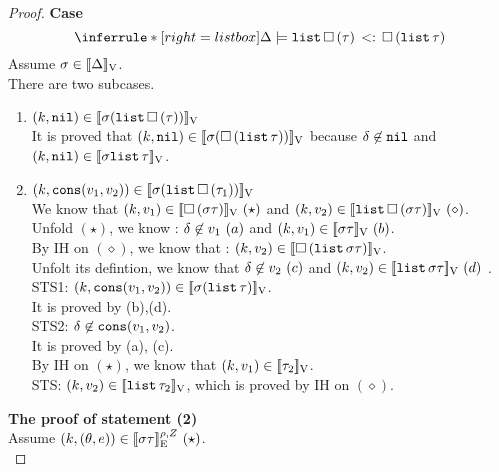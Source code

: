 \begin{proof}
\textbf{Case}
 \[
 \inferrule*[right=listbox]
    {
      \empty
    }
    {
      \Delta \models \sub{ \tlist{\tbox{\tau }}  }{ \tbox{\tlist{\tau}} } 
    }
\]
Assume $ \sigma \in [\![ \Delta ]\!]_{\text{V}}$.\\
There are two subcases. \\
\begin{enumerate}
\item  $ (k, \mathtt{nil} ) \in [\![ \sigma ( \mathtt{list} \, \mathtt{\square} \, (\tau) )   ]\!]_{\text{V}}$ \\
       It is proved that $ (k, \mathtt{nil} ) \in [\![ \sigma ( \mathtt{\square} \, (
         \mathtt{list} \, \tau ) )   ]\!]_{\text{V}}$ because $ \delta \not\in \mathtt{nil}$ and $(k, \mathtt{nil} ) \in [\![ \sigma  \mathtt{list} \, \tau    ]\!]_{\text{V}}  $.\\
\item   $  (k, \mathop{\mathtt{cons}}(v_1,v_2) ) \in [\![ \sigma (
    \mathtt{list} \,   \mathtt{\square} \, (\tau_1)  )  ]\!]_{\text{V}} $ \\
      We know that $ (k, v_1) \in [\![  \mathtt{\square} \, ( \sigma \tau
        )  ]\!]_{\text{V}} 
~(\star) $ and
      $(k, v_2) \in [\![   \mathtt{list} \,   \mathtt{\square} \, (  \sigma \tau)
          ]\!]_{\text{V}}  ~(\diamond)$.\\
      Unfold $(\star)$, we know : $ \delta \not\in v_1~(a)$ and $ (k, v_1) \in [\![  \sigma \tau
          ]\!]_{\text{V}}~(b)  $. \\
      By IH on $(\diamond)$, we know that :  $(k, v_2) \in
      [\![  \mathtt{\square} \, ( \mathtt{list} \,    \sigma \tau   )  ]\!]_{\text{V}}  $.\\
      Unfolt its defintion, we know that $\delta \not\in v_2~(c)$
      and $(k, v_2) \in
      [\![   \mathtt{list} \,    \sigma \tau     ]\!]_{\text{V}}~(d)$ . \\
     STS1: $  (k, \mathop{\mathtt{cons}}(v_1,v_2) ) \in [\![ \sigma (
    \mathtt{list} \,   \tau  )  ]\!]_{\text{V}} $.\\
           It is proved by (b),(d).\\
     
     STS2: $ \delta \not\in
  \mathop{\mathtt{cons}}(v_1,v_2) $. \\
    It is proved by (a), (c).\\
     By IH on $(\star)$, we know that $(k, v_1) \in
     [\![ \tau_2 ]\!]_{\text{V}} $.\\
    STS: $(k, v_2) \in [\![ \mathtt{list} \, \tau_2 ]\!]_{\text{V}}$, which is
    proved by IH on $(\diamond)$.
\end{enumerate}

  

\textbf{The proof of statement (2)} \\
Assume $(k, (\theta, e)) \in
 [\![ \sigma \tau ]\!]_{\text{E}}^{\rho, Z}~(\star)$. \\
%



\end{proof}
